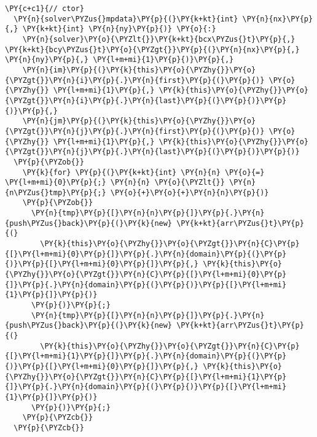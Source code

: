 \begin{Verbatim}[commandchars=\\\{\}]
  \PY{c+c1}{// ctor}
  \PY{n}{solver\PYZus{}mpdata}\PY{p}{(}\PY{k+kt}{int} \PY{n}{nx}\PY{p}{,} \PY{k+kt}{int} \PY{n}{ny}\PY{p}{)} \PY{o}{:} 
    \PY{n}{solver}\PY{o}{\PYZlt{}}\PY{k+kt}{bcx\PYZus{}t}\PY{p}{,} \PY{k+kt}{bcy\PYZus{}t}\PY{o}{\PYZgt{}}\PY{p}{(}\PY{n}{nx}\PY{p}{,} \PY{n}{ny}\PY{p}{,} \PY{l+m+mi}{1}\PY{p}{)}\PY{p}{,} 
    \PY{n}{im}\PY{p}{(}\PY{k}{this}\PY{o}{\PYZhy{}}\PY{o}{\PYZgt{}}\PY{n}{i}\PY{p}{.}\PY{n}{first}\PY{p}{(}\PY{p}{)} \PY{o}{\PYZhy{}} \PY{l+m+mi}{1}\PY{p}{,} \PY{k}{this}\PY{o}{\PYZhy{}}\PY{o}{\PYZgt{}}\PY{n}{i}\PY{p}{.}\PY{n}{last}\PY{p}{(}\PY{p}{)}\PY{p}{)}\PY{p}{,}
    \PY{n}{jm}\PY{p}{(}\PY{k}{this}\PY{o}{\PYZhy{}}\PY{o}{\PYZgt{}}\PY{n}{j}\PY{p}{.}\PY{n}{first}\PY{p}{(}\PY{p}{)} \PY{o}{\PYZhy{}} \PY{l+m+mi}{1}\PY{p}{,} \PY{k}{this}\PY{o}{\PYZhy{}}\PY{o}{\PYZgt{}}\PY{n}{j}\PY{p}{.}\PY{n}{last}\PY{p}{(}\PY{p}{)}\PY{p}{)}
  \PY{p}{\PYZob{}}
    \PY{k}{for} \PY{p}{(}\PY{k+kt}{int} \PY{n}{n} \PY{o}{=} \PY{l+m+mi}{0}\PY{p}{;} \PY{n}{n} \PY{o}{\PYZlt{}} \PY{n}{n\PYZus{}tmp}\PY{p}{;} \PY{o}{+}\PY{o}{+}\PY{n}{n}\PY{p}{)}
    \PY{p}{\PYZob{}}
      \PY{n}{tmp}\PY{p}{[}\PY{n}{n}\PY{p}{]}\PY{p}{.}\PY{n}{push\PYZus{}back}\PY{p}{(}\PY{k}{new} \PY{k+kt}{arr\PYZus{}t}\PY{p}{(}
        \PY{k}{this}\PY{o}{\PYZhy{}}\PY{o}{\PYZgt{}}\PY{n}{C}\PY{p}{[}\PY{l+m+mi}{0}\PY{p}{]}\PY{p}{.}\PY{n}{domain}\PY{p}{(}\PY{p}{)}\PY{p}{[}\PY{l+m+mi}{0}\PY{p}{]}\PY{p}{,} \PY{k}{this}\PY{o}{\PYZhy{}}\PY{o}{\PYZgt{}}\PY{n}{C}\PY{p}{[}\PY{l+m+mi}{0}\PY{p}{]}\PY{p}{.}\PY{n}{domain}\PY{p}{(}\PY{p}{)}\PY{p}{[}\PY{l+m+mi}{1}\PY{p}{]}\PY{p}{)}
      \PY{p}{)}\PY{p}{;}
      \PY{n}{tmp}\PY{p}{[}\PY{n}{n}\PY{p}{]}\PY{p}{.}\PY{n}{push\PYZus{}back}\PY{p}{(}\PY{k}{new} \PY{k+kt}{arr\PYZus{}t}\PY{p}{(}
        \PY{k}{this}\PY{o}{\PYZhy{}}\PY{o}{\PYZgt{}}\PY{n}{C}\PY{p}{[}\PY{l+m+mi}{1}\PY{p}{]}\PY{p}{.}\PY{n}{domain}\PY{p}{(}\PY{p}{)}\PY{p}{[}\PY{l+m+mi}{0}\PY{p}{]}\PY{p}{,} \PY{k}{this}\PY{o}{\PYZhy{}}\PY{o}{\PYZgt{}}\PY{n}{C}\PY{p}{[}\PY{l+m+mi}{1}\PY{p}{]}\PY{p}{.}\PY{n}{domain}\PY{p}{(}\PY{p}{)}\PY{p}{[}\PY{l+m+mi}{1}\PY{p}{]}\PY{p}{)}
      \PY{p}{)}\PY{p}{;}
    \PY{p}{\PYZcb{}}
  \PY{p}{\PYZcb{}}


\end{Verbatim}
